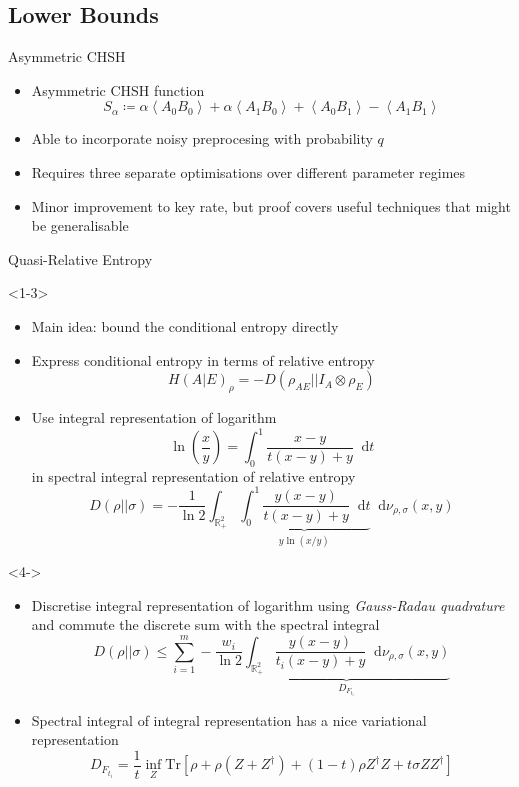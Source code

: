 \documentclass[xcolor=dvipsnames]{beamer}
\newcommand{\?}{\mathrel{?}} %
\newcommand{\dif}{\mathop{}\!\mathrm{d}} %
\newcommand{\R}{\mathbb{R}} %
\newcommand{\Tr}{\mathrm{Tr}} %
\newcommand{\angleb}[1]{\left\langle #1 \right\rangle} %
\begin{document}
\subsection{Lower Bounds}

\begin{frame}{Asymmetric CHSH}
  \begin{itemize}[<+->]
    \item Asymmetric CHSH function
      \[ S_{\alpha} \coloneqq \alpha\angleb{A_0 B_0} + \alpha\angleb{A_1 B_0} + \angleb{A_0 B_1} - \angleb{A_1 B_1} \]
    \item Able to incorporate noisy preprocesing with probability \(q\)
    \item Requires three separate optimisations over different parameter regimes
    \item Minor improvement to key rate, but proof covers useful techniques that might be generalisable
  \end{itemize}
\end{frame}

\begin{frame}{Quasi-Relative Entropy}
  \begin{onlyenv}<1-3>
  \begin{itemize}[<+->]
    \item Main idea: bound the conditional entropy directly
    \item Express conditional entropy in terms of relative entropy
      \[ H{(A|E)}_{\rho} = -D(\rho_{AE}||I_A \otimes \rho_{E}) \]
    \item Use integral representation of logarithm
      \[ \ln\left(\frac{x}{y}\right) = \int_{0}^{1} \frac{x-y}{t(x-y) + y} \dif{t} \]
      in spectral integral representation of relative entropy
      \[ D(\rho||\sigma) = -\frac{1}{\ln 2} \int_{\R^{2}_{+}} \underbrace{\int_{0}^{1} \frac{y(x-y)}{t(x-y)+y} \dif{t}}_{y\ln(x/y)} \dif{\nu_{\rho,\sigma}(x,y)} \]
  \end{itemize}
  \end{onlyenv}

  \begin{onlyenv}<4->
  \begin{itemize}[<+->]
    \item Discretise integral representation of logarithm using \emph{Gauss-Radau quadrature} and commute the discrete sum with the spectral integral
      \[ D(\rho||\sigma) \leq \sum_{i=1}^m -\frac{w_i}{\ln 2} \underbrace{\int_{\R^{2}_{+}} \frac{y(x-y)}{t_i(x-y)+y} \dif{\nu_{\rho,\sigma}(x,y)}}_{D_{F_{t_i}}} \]
    \item Spectral integral of integral representation has a nice variational representation
      \[ D_{F_{t_i}} = \frac{1}{t}  \inf_Z \Tr\left[ \rho + \rho(Z + Z^{\dagger}) + (1-t)\rho{}Z^{\dagger}Z + t\sigma{}ZZ^{\dagger} \right]\]
  \end{itemize}
  \end{onlyenv}
\end{frame}
\end{document}
